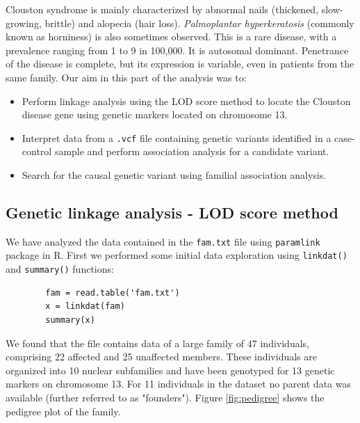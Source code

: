 \documentclass[a4paper,12pt]{article}
\begin{document}
Clouston syndrome is mainly characterized by abnormal nails (thickened, slow-growing, brittle) 
and alopecia (hair loss). \textit{Palmoplantar hyperkeratosis} (commonly known as horniness) is 
also sometimes observed. 
This is a rare disease, with a prevalence ranging from 1 to 9 in 100,000. It is autosomal dominant. 
Penetrance of the disease is complete, but its expression is variable, even in patients from the same family.
Our aim in this part of the analysis was to:

\begin{itemize}
    \item Perform linkage analysis using the LOD score method to locate the Clouston disease gene 
    using genetic markers located on chromosome 13.
    \item Interpret data from a \texttt{.vcf} file containing genetic variants identified in a 
    case-control sample and perform association analysis for a candidate variant.
    \item Search for the causal genetic variant using familial association analysis.
\end{itemize}

\subsection{Genetic linkage analysis - LOD score method}

We have analyzed the data contained in the \texttt{fam.txt} file using \texttt{paramlink} package in R. 
First we performed some initial data exploration using \texttt{linkdat()} and \texttt{summary()} functions:

    
    \begin{verbatim}
        fam = read.table('fam.txt')
        x = linkdat(fam)
        summary(x)
        \end{verbatim}

We found that the file contains data of a large family of 47 individuals, comprising 22 affected and
 25 unaffected members. These individuals are organized into 10 nuclear subfamilies and 
have been genotyped for 13 genetic markers on chromosome 13. For 11 individuals in the dataset no 
parent data was available (further referred to as "founders"). Figure \ref{fig:pedigree} shows 
the pedigree plot of the family.
\end{document}
